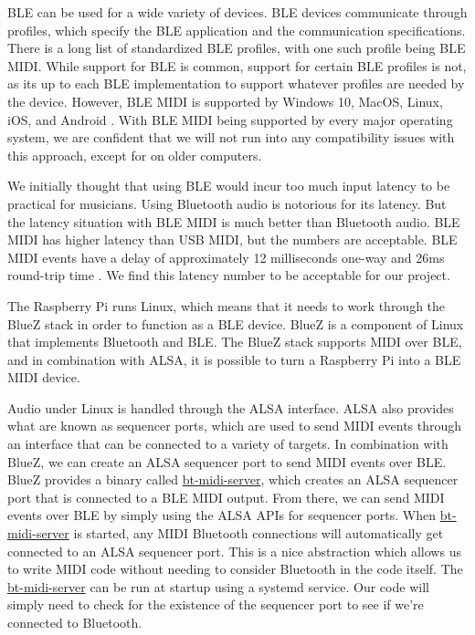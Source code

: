 BLE can be used for a wide variety of devices. BLE devices communicate through profiles,
which specify the BLE  application and the communication specifications. There is a long
list of standardized BLE profiles, with one such profile being BLE MIDI. While support for
BLE is common, support for certain BLE profiles is not, as its up to each BLE
implementation to support whatever profiles are needed by the device. However, BLE MIDI is
supported by Windows 10, MacOS, Linux, iOS, and Android \autocite{ble-latency}. With BLE
MIDI being supported by every major operating system, we are confident that we will not
run into any compatibility issues with this approach, except for on older computers.

We initially thought that using BLE would incur too much input latency to be practical for
musicians. Using Bluetooth audio is notorious for its latency. But the latency situation
with BLE MIDI is much better than Bluetooth audio. BLE MIDI has higher latency than USB
MIDI, but the numbers are acceptable. BLE MIDI events have a delay of approximately 12
milliseconds one-way and 26ms round-trip time \autocite{ble-latency}. We find this
latency number to be acceptable for our project.

The Raspberry Pi runs Linux, which means that it needs to work through the BlueZ stack in
order to function as a BLE device. BlueZ is a component of Linux that implements Bluetooth
and BLE. The BlueZ stack supports MIDI over BLE, and in combination with ALSA, it is
possible to turn a Raspberry Pi into a BLE MIDI device.

Audio under Linux is handled through the ALSA interface. ALSA also provides what are known
as sequencer ports, which are used to send MIDI events through an interface that can be
connected to a variety of targets. In combination with BlueZ, we can create an ALSA
sequencer port to send MIDI events over BLE. BlueZ provides a binary called
\url{bt-midi-server}, which creates an ALSA sequencer port that is connected to a BLE MIDI
output. From there, we can send MIDI events over BLE by simply using the ALSA APIs for
sequencer ports. When \url{bt-midi-server} is started, any MIDI Bluetooth connections will
automatically get connected to an ALSA sequencer port. This is a nice abstraction which
allows us to write MIDI code without needing to consider Bluetooth in the code itself. The
\url{bt-midi-server} can be run at startup using a systemd service. Our code will simply
need to check for the existence of the sequencer port to see if we're connected to
Bluetooth.

